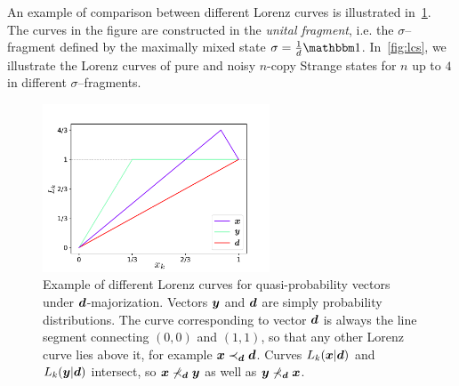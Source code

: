 \documentclass[pra,
aps,
twocolumn,
superscriptaddress,
groupedaddress,
nofootinbib,
reprint
]{revtex4-1}
\begin{document}
An example of comparison between different Lorenz curves is illustrated in~\cref{fig:lctoy}.
The curves in the figure are constructed in the \emph{unital fragment}, i.e. the $\sigma$--fragment defined by the maximally mixed state $\sigma = \frac{1}{d}\id$.
In~\cref{fig:lcs}, we illustrate the Lorenz curves of pure and noisy $n$-copy Strange states for $n$ up to $4$ in different $\sigma$--fragments.
\begin{figure}
    \centering
    \includegraphics[height=5cm]{figs/lctoy.pdf}
    \caption{Example of different Lorenz curves for quasi-probability vectors under $\bm{d}$-majorization.
    Vectors $\bm{y}$ and $\bm{d}$ are simply probability distributions.
    The curve corresponding to vector $\bm{d}$ is always the line segment connecting $(0,0)$ and $(1,1)$, so that any other Lorenz curve lies above it, for example $\bm{x} \prec_{\bm{d}} \bm{d}$.
    Curves $L_k(\bm{x}|\bm{d})$ and $L_k(\bm{y}|\bm{d})$ intersect, so $\bm{x} \nprec_{\bm{d}} \bm{y}$ as well as $\bm{y} \nprec_{\bm{d}} \bm{x}$.
    }
    \label{fig:lctoy}
\end{figure}
\end{document}
